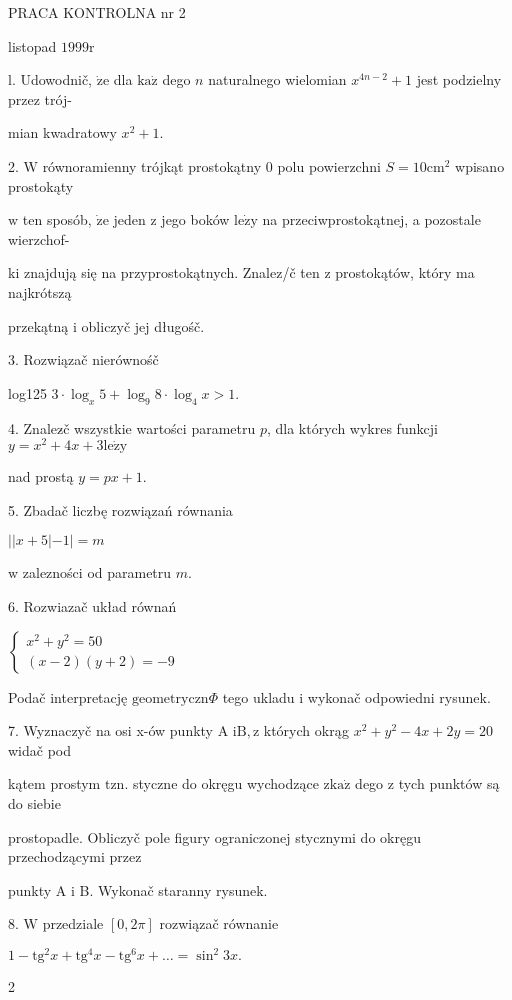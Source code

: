 \documentclass[a4paper,12pt]{article}
\begin{document}
PRACA KONTROLNA nr 2

listopad $1999\mathrm{r}$

l. Udowodnič, $\dot{\mathrm{z}}\mathrm{e}$ dla $\mathrm{k}\mathrm{a}\dot{\mathrm{z}}$ dego $n$ naturalnego wielomian $x^{4n-2}+1$ jest podzielny przez trój-

mian kwadratowy $x^{2}+1.$

2. $\mathrm{W}$ równoramienny trójkąt prostokątny $0$ polu powierzchni $S=10\mathrm{c}\mathrm{m}^{2}$ wpisano prostokąty

$\mathrm{w}$ ten sposób, $\dot{\mathrm{z}}\mathrm{e}$ jeden $\mathrm{z}$ jego boków $\mathrm{l}\mathrm{e}\dot{\mathrm{z}}\mathrm{y}$ na przeciwprostokątnej, a pozostale wierzchof-

ki znajdują się na przyprostokątnych. Znalez/č ten $\mathrm{z}$ prostokątów, który ma najkrótszą

przekątną $\mathrm{i}$ obliczyč jej długośč.

3. Rozwiązač nierównośč

log125 $3\cdot\log_{x}5+\log_{9}8\cdot\log_{4}x>1.$

4. Znalez$\acute{}$č wszystkie wartości parametru $p$, dla których wykres funkcji $y=x^{2}+4x+3\mathrm{l}\mathrm{e}\dot{\mathrm{z}}\mathrm{y}$

nad prostą $y=px+1.$

5. Zbadač liczbę rozwiązań równania

$||x+5|-1|=m$

$\mathrm{w}$ zalezności od parametru $m.$

6. Rozwiazač układ równań

$\left\{\begin{array}{l}
x^{2}+y^{2}=50\\
(x-2)(y+2)=-9
\end{array}\right.$

Podač interpretację $\mathrm{g}\mathrm{e}\mathrm{o}\mathrm{m}\mathrm{e}\mathrm{t}\mathrm{r}\mathrm{y}\mathrm{c}\mathrm{z}\mathrm{n}\Phi$ tego ukladu $\mathrm{i}$ wykonač odpowiedni rysunek.

7. Wyznaczyč na osi x-ów punkty A $\mathrm{i}\mathrm{B}, \mathrm{z}$ których okrąg $x^{2}+y^{2}-4x+2y=20$ widač pod

kątem prostym $\mathrm{t}\mathrm{z}\mathrm{n}$. styczne do okręgu wychodzące $\mathrm{z}\mathrm{k}\mathrm{a}\dot{\mathrm{z}}$ dego $\mathrm{z}$ tych punktów są do siebie

prostopadle. Obliczyč pole figury ograniczonej stycznymi do okręgu przechodzącymi przez

punkty A $\mathrm{i}$ B. Wykonač staranny rysunek.

8. $\mathrm{W}$ przedziale $[0,2\pi]$ rozwiązač równanie

$1-\mathrm{t}\mathrm{g}^{2}x+\mathrm{t}\mathrm{g}^{4}x-\mathrm{t}\mathrm{g}^{6}x+\ldots=\sin^{2}3x.$

2
\end{document}
